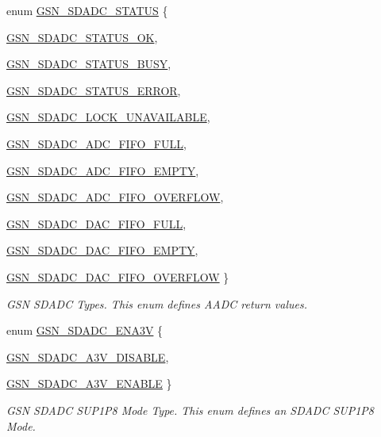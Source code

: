 \begin{DoxyCompactItemize}
enum \hyperlink{a00652_ga179a090b2c7d55f208c9a4a6c79eda05}{GSN\_\-SDADC\_\-STATUS} \{ \par
\hyperlink{a00652_gga179a090b2c7d55f208c9a4a6c79eda05a6a30ec8def6ccdce6b79a717b9d8b97b}{GSN\_\-SDADC\_\-STATUS\_\-OK}, 
\par
\hyperlink{a00652_gga179a090b2c7d55f208c9a4a6c79eda05a0d45011d4a772d5f07cecba59ba1f036}{GSN\_\-SDADC\_\-STATUS\_\-BUSY}, 
\par
\hyperlink{a00652_gga179a090b2c7d55f208c9a4a6c79eda05a86caf7bae52ffcbd29be0aaa43196c25}{GSN\_\-SDADC\_\-STATUS\_\-ERROR}, 
\par
\hyperlink{a00652_gga179a090b2c7d55f208c9a4a6c79eda05ac463db53bfc6aa75ec87b3d0f42018d9}{GSN\_\-SDADC\_\-LOCK\_\-UNAVAILABLE}, 
\par
\hyperlink{a00652_gga179a090b2c7d55f208c9a4a6c79eda05a6056590b14995986c1e318d4187d97de}{GSN\_\-SDADC\_\-ADC\_\-FIFO\_\-FULL}, 
\par
\hyperlink{a00652_gga179a090b2c7d55f208c9a4a6c79eda05adb747ececb649e74975daea55ccf41f4}{GSN\_\-SDADC\_\-ADC\_\-FIFO\_\-EMPTY}, 
\par
\hyperlink{a00652_gga179a090b2c7d55f208c9a4a6c79eda05afc2337003c5e5cd3b4b7786e545b71f7}{GSN\_\-SDADC\_\-ADC\_\-FIFO\_\-OVERFLOW}, 
\par
\hyperlink{a00652_gga179a090b2c7d55f208c9a4a6c79eda05a62df04737614dcf424934731aedcfcdf}{GSN\_\-SDADC\_\-DAC\_\-FIFO\_\-FULL}, 
\par
\hyperlink{a00652_gga179a090b2c7d55f208c9a4a6c79eda05aa199f92a4d6e646ef987def79632bd60}{GSN\_\-SDADC\_\-DAC\_\-FIFO\_\-EMPTY}, 
\par
\hyperlink{a00652_gga179a090b2c7d55f208c9a4a6c79eda05ac65b338117dc65bf8e668c1ef7a1ab63}{GSN\_\-SDADC\_\-DAC\_\-FIFO\_\-OVERFLOW}
 \}
\begin{DoxyCompactList}\small\item\em GSN SDADC Types. This enum defines AADC return values. \end{DoxyCompactList}\item 
enum \hyperlink{a00652_ga30a4571db8d9a123a6c9cf0f5c3c1146}{GSN\_\-SDADC\_\-ENA3V} \{ \par
\hyperlink{a00652_gga30a4571db8d9a123a6c9cf0f5c3c1146ac716b0dabbe05e6906f849c0a06e0078}{GSN\_\-SDADC\_\-A3V\_\-DISABLE}, 
\par
\hyperlink{a00652_gga30a4571db8d9a123a6c9cf0f5c3c1146a35afd32a028e07d4d39c07089b9bca93}{GSN\_\-SDADC\_\-A3V\_\-ENABLE}
 \}
\begin{DoxyCompactList}\small\item\em GSN SDADC SUP1P8 Mode Type. This enum defines an SDADC SUP1P8 Mode. \end{DoxyCompactList}\item 

\end{DoxyCompactItemize}
